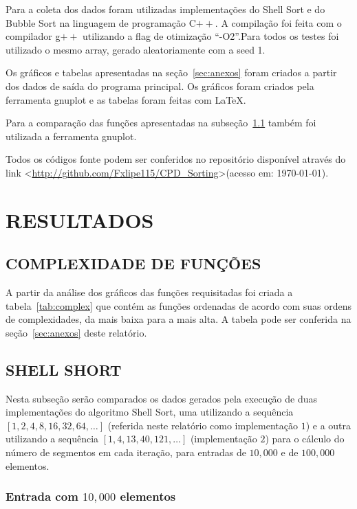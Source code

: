 \documentclass[titlepage,12pt,a4paper]{article}
\begin{document}
    Para a coleta dos dados foram utilizadas implementações do Shell Sort e do
    Bubble Sort na linguagem de programação C$++$. A compilação foi feita com o
    compilador g$++$ utilizando a flag de otimização ``-O2''.Para todos os testes
    foi utilizado o mesmo array, gerado aleatoriamente com a seed 1.

    Os gráficos e tabelas apresentadas na seção~\ref{sec:anexos} foram criados a
    partir dos dados de saída do programa principal. Os gráficos foram criados
    pela ferramenta gnuplot e as tabelas foram feitas com \LaTeX.

    Para a comparação das funções apresentadas na subseção~\ref{subsec:complex}
    também foi utilizada a ferramenta gnuplot.

    Todos os códigos fonte podem ser conferidos no repositório disponível através
    do link \textless\url{http://github.com/Fxlipe115/CPD_Sorting}\textgreater(acesso em: \today).

  \section{RESULTADOS}

    \subsection{COMPLEXIDADE DE FUNÇÕES}
      \label{subsec:complex}

      A partir da análise dos gráficos das funções requisitadas foi criada a
      tabela~\ref{tab:complex} que contém as funções ordenadas de acordo com suas
      ordens de complexidades, da mais baixa para a mais alta. A tabela pode ser
      conferida na seção~\ref{sec:anexos} deste relatório.

    \subsection{SHELL SHORT}

      Nesta subseção serão comparados os dados gerados pela execução de duas
      implementações do algoritmo Shell Sort, uma utilizando a sequência
      $[1,2,4,8,16,32,64,\ldots]$ (referida neste relatório como implementação $1$)
      e a outra utilizando a sequência $[1,4,13,40,121,\ldots]$ (implementação $2$)
      para o cálculo do número de segmentos em cada iteração, para entradas de
      $10,000$ e de $100,000$ elementos.

      \subsubsection{Entrada com $10,000$ elementos}
\end{document}
